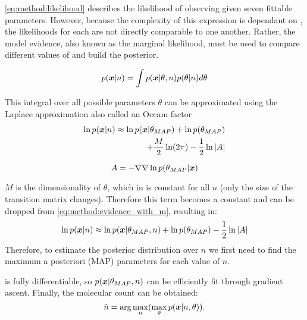 \eqref{eq:method:likelihood} describes the likelihood of observing \trace given seven fittable parameters.
  However, because the complexity of this expression is dependant on \n, the likelihoods for each \n are not directly comparable to one another.
  Rather, the model evidence, also known as the marginal likelihood, must be used to compare different values of \n and build the posterior. 

  \begin{equation*}
    p(\bm{x} | n) = \int p(\bm{x} | \theta, n) p(\theta | n) d\theta
  \end{equation*}

  This integral over all possible parameters $\theta$ can be approximated using the 
  Laplace approximation also called an Occam factor \cite{bishop_pattern_2006}
  \begin{align*}
    \ln p(\bm{x} | n) \approx \ln p(\bm{x} | \theta_{MAP}) + \ln p(\theta_{MAP}) &\\
    + \frac{M}{2} \ln(2\pi) - \frac{1}{2} \ln |A|
    \label{eq:method:evidence_with_m}
  \end{align*}

  \begin{equation*}
    A = -\nabla \nabla \ln p(\theta_{MAP} | \bm{x})
  \end{equation*}

  $M$ is the dimensionality of $\theta$, which in \ours is constant
  for all $n$ (only the size of the transition matrix changes).
  Therefore this term becomes a constant and can be dropped from 
  \eqref{eq:method:evidence_with_m}, resulting in:
  \begin{equation}
    \ln p(\bm{x} | n) \approx \ln p(\bm{x} | \theta_{MAP}, n) + \ln p(\theta_{MAP}) - \frac{1}{2} \ln |A|
    \label{eq:method:evidence}
  \end{equation}
  Therefore, to estimate the posterior distribution over $n$ we first need to 
  find the maximum a posteriori (MAP) parameters for each value of $n$. 

  \ours is fully differentiable, so $p(\bm{x} | \theta_{MAP}, n)$ can be efficiently 
  fit through gradient ascent.
  Finally, the molecular count can be obtained:
  \begin{equation}
      \hat{n} =
      \text{arg}\max_{n}(
      \max_\theta
      p(\bm{x}|n,\theta))
    \text{.}
    \label{eq:method:optimization}
  \end{equation}

